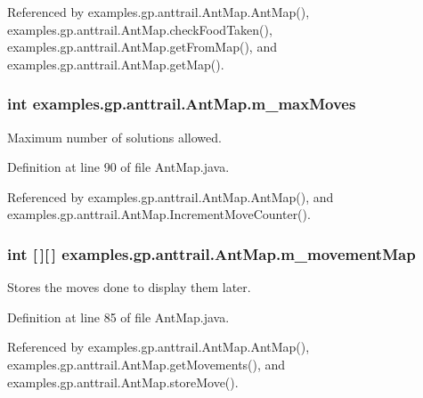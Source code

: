 Referenced by examples.\-gp.\-anttrail.\-Ant\-Map.\-Ant\-Map(), examples.\-gp.\-anttrail.\-Ant\-Map.\-check\-Food\-Taken(), examples.\-gp.\-anttrail.\-Ant\-Map.\-get\-From\-Map(), and examples.\-gp.\-anttrail.\-Ant\-Map.\-get\-Map().

\hypertarget{classexamples_1_1gp_1_1anttrail_1_1_ant_map_a44eed38784d41f1d2296a7055ddde1b6}{
\subsubsection[{m\-\_\-max\-Moves}]{\setlength{\rightskip}{0pt plus 5cm}int examples.\-gp.\-anttrail.\-Ant\-Map.\-m\-\_\-max\-Moves\hspace{0.3cm}{\ttfamily [private]}}}\label{classexamples_1_1gp_1_1anttrail_1_1_ant_map_a44eed38784d41f1d2296a7055ddde1b6}
Maximum number of solutions allowed. 

Definition at line 90 of file Ant\-Map.\-java.



Referenced by examples.\-gp.\-anttrail.\-Ant\-Map.\-Ant\-Map(), and examples.\-gp.\-anttrail.\-Ant\-Map.\-Increment\-Move\-Counter().

\hypertarget{classexamples_1_1gp_1_1anttrail_1_1_ant_map_a1b9b0d79c9d7638122ad5c56cb48b9fe}{
\subsubsection[{m\-\_\-movement\-Map}]{\setlength{\rightskip}{0pt plus 5cm}int \mbox{[}$\,$\mbox{]}\mbox{[}$\,$\mbox{]} examples.\-gp.\-anttrail.\-Ant\-Map.\-m\-\_\-movement\-Map\hspace{0.3cm}{\ttfamily [private]}}}\label{classexamples_1_1gp_1_1anttrail_1_1_ant_map_a1b9b0d79c9d7638122ad5c56cb48b9fe}
Stores the moves done to display them later. 

Definition at line 85 of file Ant\-Map.\-java.



Referenced by examples.\-gp.\-anttrail.\-Ant\-Map.\-Ant\-Map(), examples.\-gp.\-anttrail.\-Ant\-Map.\-get\-Movements(), and examples.\-gp.\-anttrail.\-Ant\-Map.\-store\-Move().

